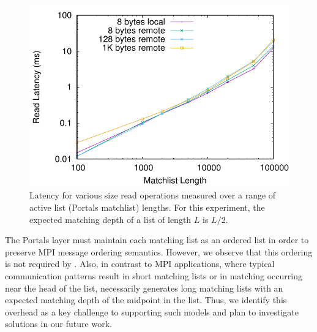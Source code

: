 \begin{figure}
    \centering
    \includegraphics[width=.95\linewidth]{plots/mlen}
    \caption{Latency for various size read operations measured over a range of active list (Portals matchlist) lengths. For this experiment, the expected matching depth of a list of length $L$ is $L/2$.}
    \label{fig:mlen}
\end{figure}

The Portals layer must maintain each matching list as an ordered list in order
to preserve MPI message ordering semantics.  However, we observe that this
ordering is not required by \pdht.  Also, in contrast to MPI applications,
where typical communication patterns result in short matching lists or in
matching occurring near the head of the list, \pdht necessarily generates long
matching lists with an expected matching depth of the midpoint in the list.
Thus, we identify this overhead as a key challenge to supporting such models
and plan to investigate solutions in our future work.

